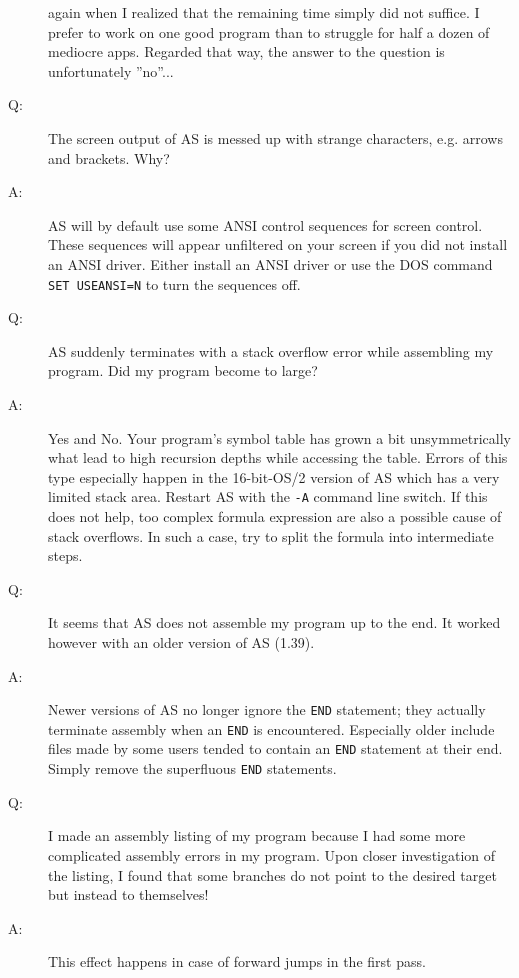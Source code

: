 \documentclass[12pt,twoside]{report}
\newcommand{\tty}[1]{{\tt #1}}
\newcommand{\asname}{{AS}}
\begin{document}
\begin{description}
{   again when I realized that the remaining time simply did not
   suffice.  I prefer to work on one good program than to struggle for
   half a dozen of mediocre apps.  Regarded that way, the answer to
   the question is unfortunately ''no''...}
\vspace{0.3cm}
\item[Q:]{The screen output of \asname{} is messed up with strange characters, e.g.
   arrows and brackets.  Why?}
\item[A:]{\asname{} will by default use some ANSI control sequences for screen
   control.  These sequences will appear unfiltered on your screen
   if you did not install an ANSI driver.  Either install an ANSI
   driver or use the DOS command \tty{SET USEANSI=N} to turn the
   sequences off.}
\vspace{0.3cm}
\item[Q:]{\asname{} suddenly terminates with a stack overflow error while
   assembling my program.  Did my program become to large?}
\item[A:]{Yes and No.  Your program's symbol table has grown a bit
   unsymmetrically what lead to high recursion depths while accessing
   the table.  Errors of this type especially happen in the
   16-bit-OS/2 version of \asname{} which has a very limited stack area.
   Restart \asname{} with the \tty{-A} command line switch.  If this does not
   help, too complex formula expression are also a possible cause of
   stack overflows.  In such a case, try to split the formula into
   intermediate steps.}
\vspace{0.3cm}
\item[Q:]{It seems that \asname{} does not assemble my program up to the end.  It
   worked however with an older version of \asname{} (1.39).}
\item[A:]{Newer versions of \asname{} no longer ignore the \tty{END} statement; they
   actually terminate assembly when an \tty{END} is encountered.
   Especially older include files made by some users tended to
   contain an \tty{END} statement at their end.  Simply remove the
   superfluous \tty{END} statements.}
\vspace{0.3cm}
\item[Q:]{I made an assembly listing of my program because I had some more
   complicated assembly errors in my program.  Upon closer
   investigation of the listing, I found that some branches do not
   point to the desired target but instead to themselves!}
\item[A:]{This effect happens in case of forward jumps in the first pass.
}
\end{description}
\end{document}
